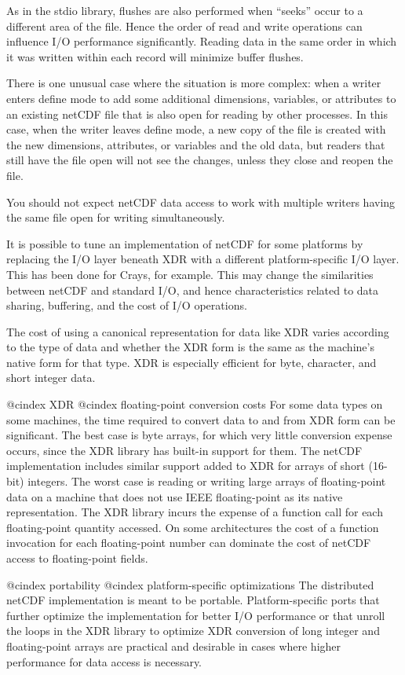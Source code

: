 {As in the stdio library, flushes are also performed when ``seeks'' occur
to a different area of the file.  Hence the order of read and write
operations can influence I/O performance significantly.  Reading data in
the same order in which it was written within each record will minimize
buffer flushes.

There is one unusual case where the situation is more complex: when a
writer enters define mode to add some additional dimensions, variables,
or attributes to an existing netCDF file that is also open for reading
by other processes.  In this case, when the writer leaves define mode, a
new copy of the file is created with the new dimensions, attributes, or
variables and the old data, but readers that still have the file open
will not see the changes, unless they close and reopen the file.

You should not expect netCDF data access to work with multiple writers
having the same file open for writing simultaneously.

It is possible to tune an implementation of netCDF for some platforms by
replacing the I/O layer beneath XDR with a different platform-specific
I/O layer.  This has been done for Crays, for example.
This may change the similarities between netCDF and standard
I/O, and hence characteristics related to data sharing, buffering, and
the cost of I/O operations.

The cost of using a canonical representation for data like XDR varies
according to the type of data and whether the XDR form is the same as the
machine's native form for that type.  XDR is especially efficient for
byte, character, and short integer data.

@cindex XDR
@cindex floating-point conversion costs
For some data types on some machines, the time required to convert data
to and from XDR form can be significant.  The best case is byte arrays,
for which very little conversion expense occurs, since the XDR library
has built-in support for them.  The netCDF implementation
includes similar support added to XDR for arrays of short (16-bit)
integers.  The worst case is reading or writing large arrays of
floating-point data on a machine that does not use IEEE floating-point
as its native representation.  The XDR library incurs the expense of a
function call for each floating-point quantity accessed.  On some
architectures the cost of a function invocation for each floating-point
number can dominate the cost of netCDF access to floating-point fields.

@cindex portability
@cindex platform-specific optimizations
The distributed netCDF implementation is meant to be portable.
Platform-specific ports that further optimize the implementation for
better I/O performance or that unroll the loops in the XDR library to
optimize XDR conversion of long integer and floating-point arrays are
practical and desirable in cases where higher performance for data
access is necessary.

}
